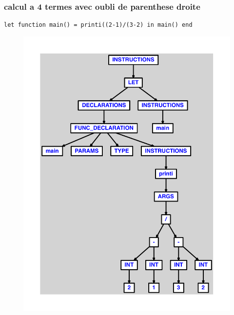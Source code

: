 \documentclass{article}
\begin{document}
\subsubsection{calcul a 4 termes avec oubli de parenthese droite}
\begin{lstlisting}
let function main() = printi((2-1)/(3-2) in main() end
\end{lstlisting}
\newpage
\begin{figure}[H]
\centering
\includegraphics[max width=\textwidth]{ast/ast_32.pdf}
\end{figure}
\newpage
\end{document}
